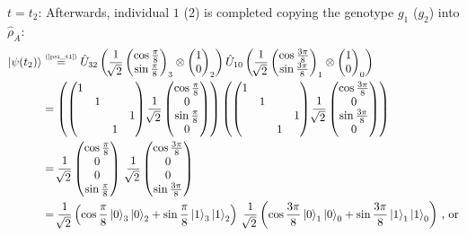 \documentclass[11pt]{article}
\numberwithin{equation}{section} %
\numberwithin{figure}{section} %
\newcommand\numeq[1] %
  {\stackrel{\scriptscriptstyle(\mkern-1.5mu#1\mkern-1.5mu)}{=}}
\begin{document}
$t=t_2$: Afterwards,  individual $1$ ($2$) is completed copying the genotype $g_1$ ($g_2$) into $\hat{\rho}_A$: $\,$ \cite[p.~3, l.~5-7]{QAL_IBM} 
\begin{equation} \label{psi_t2}
\begin{split}
\ket{\psi(t_2)}
&	\numeq{\textrm{\ref{psi_t1}}} \hat{U}_{32}\left(\frac{1}{\sqrt[]{2}}\begin{pmatrix} \cos\frac{\pi}{8}\\ \sin\frac{\pi}{8}\end{pmatrix}_3\otimes\begin{pmatrix}1\\0
\end{pmatrix}_2\right) \hat{U}_{10}\left(\frac{1}{\sqrt[]{2}}\begin{pmatrix} \cos\frac{3\pi}{8}\\ \sin\frac{3\pi}{8}\end{pmatrix}_1\otimes\begin{pmatrix}1\\0
\end{pmatrix}_0\right)\\
&	=\left(\begin{pmatrix}1&&&\\ &1&&\\ &&&1\\ &&1&\end{pmatrix}\frac{1}{\sqrt[]{2}}\begin{pmatrix}\cos\frac{\pi}{8}\\ 0\\ \sin\frac{\pi}{8}\\ 0\end{pmatrix}\right)  \left(\begin{pmatrix}1&&&\\ &1&&\\ &&&1\\ &&1&\end{pmatrix}\frac{1}{\sqrt[]{2}}\begin{pmatrix}\cos\frac{3\pi}{8}\\ 0\\ \sin\frac{3\pi}{8}\\ 0\end{pmatrix}\right)\\
&	=\frac{1}{\sqrt[]{2}}\begin{pmatrix}\cos\frac{\pi}{8}\\ 0\\ 0\\ \sin\frac{\pi}{8}\end{pmatrix}\,\,\frac{1}{\sqrt[]{2}}\begin{pmatrix}\cos\frac{3\pi}{8}\\ 0\\ 0\\ \sin\frac{3\pi}{8}\end{pmatrix}\\
&	= \frac{1}{\sqrt[]{2}} \left(\cos\frac{\pi}{8}\ket{0}_3\ket{0}_2 + \sin\frac{\pi}{8}\ket{1}_3\ket{1}_2\right)\,\,\frac{1}{\sqrt[]{2}} \left(\cos\frac{3\pi}{8}\ket{0}_1\ket{0}_0 + \sin\frac{3\pi}{8}\ket{1}_1\ket{1}_0\right)		 \,\textrm{, or}\end{split}
\end{equation}
\end{document}
